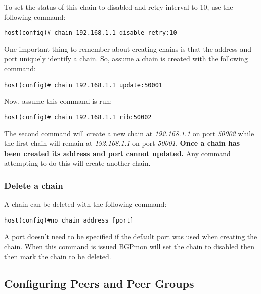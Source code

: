 To set the status of this chain to disabled and retry interval to 10, use the following command:\\

\begin{Verbatim}[frame=single]
host(config)# chain 192.168.1.1 disable retry:10
\end{Verbatim}

One important thing to remember about creating chains is that the address and port uniquely identify a chain.
So, assume a chain is created with the following command:\\

\begin{Verbatim}[frame=single]
host(config)# chain 192.168.1.1 update:50001
\end{Verbatim}

Now, assume this command is run:\\

\begin{Verbatim}[frame=single]
host(config)# chain 192.168.1.1 rib:50002
\end{Verbatim}

The second command will create a new chain at \emph{192.168.1.1} on port \emph{50002} while the first chain will remain at \emph{192.168.1.1} on port \emph{50001}.  {\bf Once a chain has been created its address and port cannot updated.}  Any command attempting to do this will create another chain.

\subsubsection{Delete a chain}
\label{sec:configure:chains:delete}

A chain can be deleted with the following command:\\

\begin{Verbatim}[frame=single]
host(config)#no chain address [port]
\end{Verbatim}

A port doesn't need to be specified if the default port was used when creating the chain.  When this command is issued BGPmon will set the chain to disabled then then mark the chain to be deleted.

\subsection{Configuring Peers and Peer Groups}
\label{sec:configure:peers}

